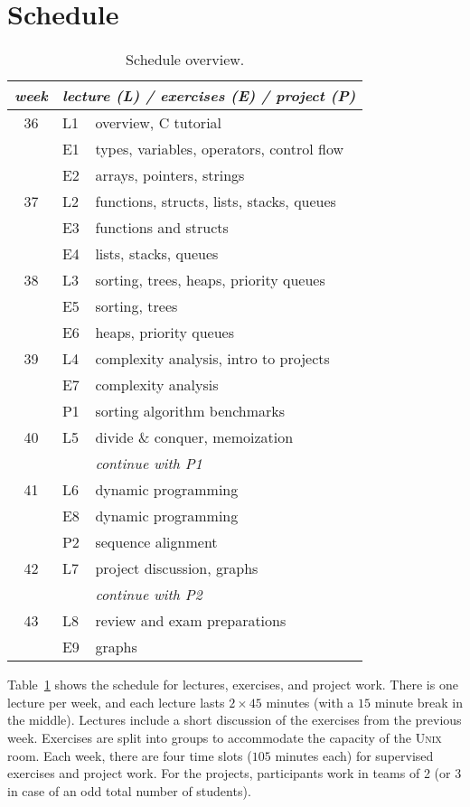 \documentclass[a4paper]{article}
\begin{document}
\section{Schedule}

\begin{table}
  \centering
  \begin{tabular}{|cll|}
    \hline
    \emph{week} & \multicolumn{2}{l}{\emph{lecture (L) / exercises (E) / project (P)}} \\
    \hline
    36 & L1 & overview, C tutorial \\
       & E1 & types, variables, operators, control flow \\
       & E2 & arrays, pointers, strings \\
    \hline
    37 & L2 & functions, structs, lists, stacks, queues \\
       & E3 & functions and structs \\
       & E4 & lists, stacks, queues  \\
    \hline
    38 & L3 & sorting, trees, heaps, priority queues \\
       & E5 & sorting, trees \\
       & E6 & heaps, priority queues \\
    \hline
    39 & L4 & complexity analysis, intro to projects \\
       & E7 & complexity analysis \\
       & P1 & sorting algorithm benchmarks \\
    \hline
    40 & L5 & divide \& conquer, memoization \\
       &    & \emph{continue with P1} \\
    \hline
    41 & L6 & dynamic programming \\
       & E8 & dynamic programming \\
       & P2 & sequence alignment \\
    \hline
    42 & L7 & project discussion, graphs \\
       &    & \emph{continue with P2} \\
    \hline
    43 & L8 & review and exam preparations \\
       & E9 & graphs \\
    \hline
  \end{tabular}
  \caption{Schedule overview.}\label{tab:schedule}
\end{table}

Table~\ref{tab:schedule} shows the schedule for lectures, exercises, and project work.
There is one lecture per week, and each lecture lasts $2\times 45$ minutes (with a $15$ minute break in the middle).
Lectures include a short discussion of the exercises from the previous week.
Exercises are split into groups to accommodate the capacity of the \textsc{Unix} room.
Each week, there are four time slots ($105$ minutes each) for supervised exercises and project work.
For the projects, participants work in teams of 2 (or 3 in case of an odd total number of students).
\end{document}
